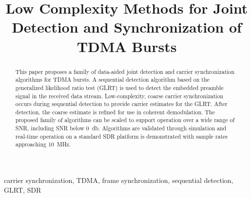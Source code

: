 \documentclass[10pt,final,conference,comsoc]{IEEEtran}
\begin{document}
\title{Low Complexity Methods for Joint Detection and Synchronization of TDMA Bursts}
\author{
}

\maketitle

\begin{abstract}
This paper proposes a family of data-aided joint detection and carrier synchronization algorithms for 
TDMA bursts.
A sequential detection algorithm based on the generalized likelihood ratio test (GLRT)
is used to detect the embedded preamble signal in the received data
stream.
Low-complexity, coarse carrier synchronization 
occurs during sequential detection to provide carrier estimates for
the GLRT.\@
After detection,
the coarse estimate is refined for use in coherent demodulation.
The proposed family of algorithms can be scaled to support operation
over a wide range of SNR, including SNR below \SI{0}{\decibel}.
Algorithms are validated through simulation and real-time operation on
a standard SDR platform is demonstrated with sample rates approaching
\SI{10}{\mega\hertz}.

\end{abstract}

\begin{IEEEkeywords}
carrier synchronization, TDMA, frame synchronization, sequential
detection, GLRT, SDR
\end{IEEEkeywords}















\end{document}
